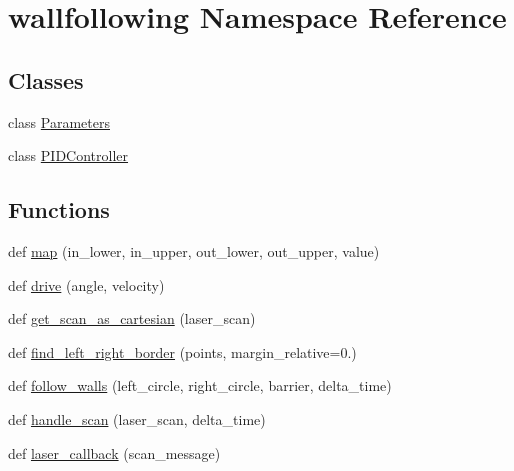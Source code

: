 \hypertarget{namespacewallfollowing}{}\section{wallfollowing Namespace Reference}
\label{namespacewallfollowing}
\subsection*{Classes}
\begin{DoxyCompactItemize}
\item 
class \hyperlink{classwallfollowing_1_1_parameters}{Parameters}
\item 
class \hyperlink{classwallfollowing_1_1_p_i_d_controller}{P\+I\+D\+Controller}
\end{DoxyCompactItemize}
\subsection*{Functions}
\begin{DoxyCompactItemize}
\item 
def \hyperlink{namespacewallfollowing_a908b60b64e20dec7078e707a829b610d}{map} (in\+\_\+lower, in\+\_\+upper, out\+\_\+lower, out\+\_\+upper, value)
\item 
def \hyperlink{namespacewallfollowing_a66b98adda1f5c1ba1ed6c0029a5d27f6}{drive} (angle, velocity)
\item 
def \hyperlink{namespacewallfollowing_aacb7060aae10ef40bdacceb57283943c}{get\+\_\+scan\+\_\+as\+\_\+cartesian} (laser\+\_\+scan)
\item 
def \hyperlink{namespacewallfollowing_a85455c82dd12c297c8cbc3227c1ba598}{find\+\_\+left\+\_\+right\+\_\+border} (points, margin\+\_\+relative=0.)
\item 
def \hyperlink{namespacewallfollowing_ae4edc6135d6c1a9b38674119a96b3375}{follow\+\_\+walls} (left\+\_\+circle, right\+\_\+circle, barrier, delta\+\_\+time)
\item 
def \hyperlink{namespacewallfollowing_a48cc636bf9056c7b7b2db2dede94474a}{handle\+\_\+scan} (laser\+\_\+scan, delta\+\_\+time)
\item 
def \hyperlink{namespacewallfollowing_a53e20aefe2b925b41b17f60b6673840b}{laser\+\_\+callback} (scan\+\_\+message)
\end{DoxyCompactItemize}
